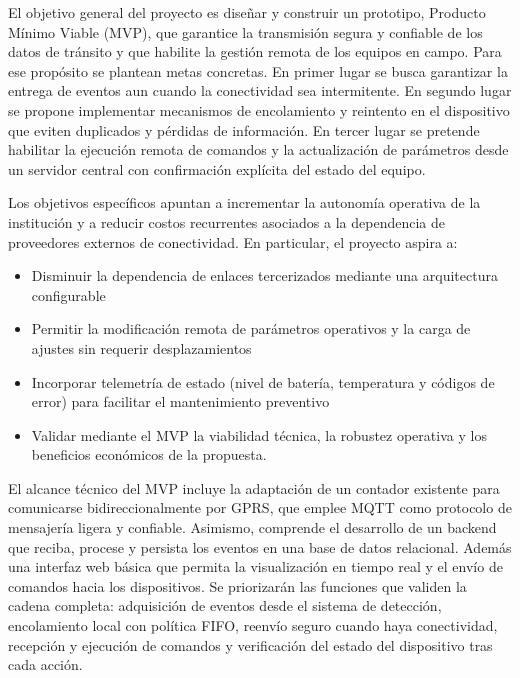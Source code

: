 El objetivo general del proyecto es diseñar y construir un prototipo, Producto Mínimo Viable (MVP), que garantice la transmisión segura y confiable de los datos de tránsito y que habilite la gestión remota de los equipos en campo. Para ese propósito se plantean metas concretas. 
En primer lugar se busca garantizar la entrega de eventos aun cuando la conectividad sea intermitente. En segundo lugar se propone implementar mecanismos de encolamiento y reintento en el dispositivo que eviten duplicados y pérdidas de información. En tercer lugar se pretende habilitar la ejecución remota de comandos y la actualización de parámetros desde un servidor central con confirmación explícita del estado del equipo.

Los objetivos específicos apuntan a incrementar la autonomía operativa de la institución y a reducir costos recurrentes asociados a la dependencia de proveedores externos de conectividad. En particular, el proyecto aspira a: 
\begin{itemize}
\item Disminuir la dependencia de enlaces tercerizados mediante una arquitectura configurable

\item Permitir la modificación remota de parámetros operativos y la carga de ajustes sin requerir desplazamientos 

\item Incorporar telemetría de estado (nivel de batería, temperatura y códigos de error) para facilitar el mantenimiento preventivo

\item Validar mediante el MVP la viabilidad técnica, la robustez operativa y los beneficios económicos de la propuesta.
\end{itemize}

El alcance técnico del MVP incluye la adaptación de un contador existente para comunicarse bidireccionalmente por GPRS, que emplee MQTT como protocolo de mensajería ligera y confiable. Asimismo, comprende el desarrollo de un backend que reciba, procese y persista los eventos en una base de datos relacional. Además una interfaz web básica que permita la visualización en tiempo real y el envío de comandos hacia los dispositivos. Se priorizarán las funciones que validen la cadena completa: adquisición de eventos desde el sistema de detección, encolamiento local con política FIFO, reenvío seguro cuando haya conectividad, recepción y ejecución de comandos y verificación del estado del dispositivo tras cada acción.

